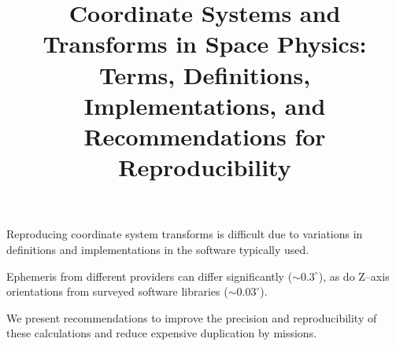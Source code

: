 \documentclass[draft]{agujournal2019}
\begin{document}
\title{Coordinate Systems and Transforms in Space Physics: Terms, Definitions, Implementations, and Recommendations for Reproducibility}









\noindent




\begin{keypoints}
\item Reproducing coordinate system transforms is difficult due to variations in definitions and implementations in the software typically used.
\item Ephemeris from different providers can differ significantly (${\sim}0.3^\circ$), as do Z--axis orientations from surveyed software libraries (${\sim}0.03^\circ$).
\item We present recommendations to improve the precision and reproducibility of these calculations and reduce expensive duplication by missions.
\end{keypoints}
\end{document}
